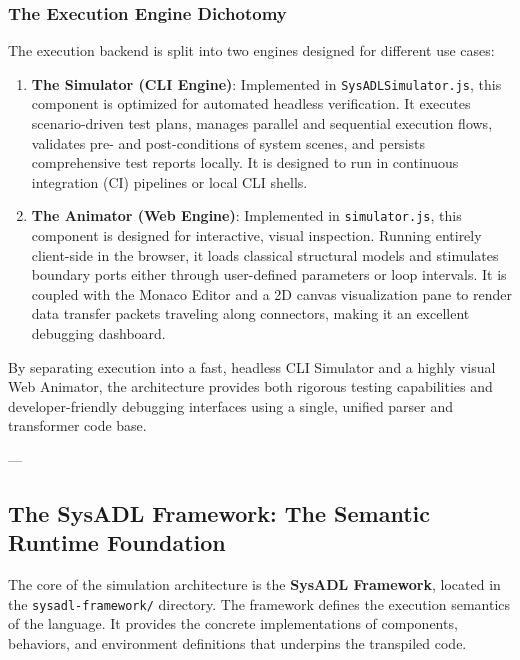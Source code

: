 \subsubsection{The Execution Engine Dichotomy}
The execution backend is split into two engines designed for different use cases:
\begin{enumerate}
    \item \textbf{The Simulator (CLI Engine)}: Implemented in \texttt{SysADLSimulator.js}, this component is optimized for automated headless verification. It executes scenario-driven test plans, manages parallel and sequential execution flows, validates pre- and post-conditions of system scenes, and persists comprehensive test reports locally. It is designed to run in continuous integration (CI) pipelines or local CLI shells.
    \item \textbf{The Animator (Web Engine)}: Implemented in \texttt{simulator.js}, this component is designed for interactive, visual inspection. Running entirely client-side in the browser, it loads classical structural models and stimulates boundary ports either through user-defined parameters or loop intervals. It is coupled with the Monaco Editor and a 2D canvas visualization pane to render data transfer packets traveling along connectors, making it an excellent debugging dashboard.
\end{enumerate}

By separating execution into a fast, headless CLI Simulator and a highly visual Web Animator, the architecture provides both rigorous testing capabilities and developer-friendly debugging interfaces using a single, unified parser and transformer code base.

---

\subsection{The SysADL Framework: The Semantic Runtime Foundation}

The core of the simulation architecture is the \textbf{SysADL Framework}, located in the \texttt{sysadl-framework/} directory. The framework defines the execution semantics of the language. It provides the concrete implementations of components, behaviors, and environment definitions that underpins the transpiled code.

